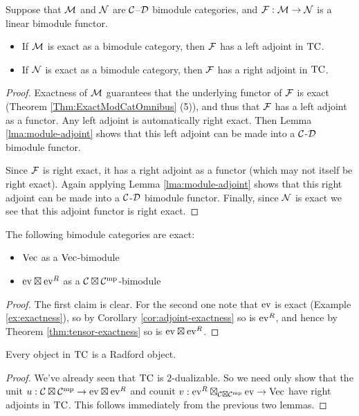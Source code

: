 \documentclass{amsart}
\begin{document}
\begin{lemma}
Suppose that $\cM$ and $\cN$ are $\cC$--$\cD$ bimodule categories, and $\cF: \cM \rightarrow \cN$ is a linear bimodule functor.
\begin{itemize}
\item If $\cM$ is exact as a bimodule category, then $\cF$ has a left adjoint in $\TC$.
\item If $\cN$ is exact as a bimodule category, then $\cF$ has a right adjoint in $\TC$.
\end{itemize}
\end{lemma}

\begin{proof}
Exactness of $\cM$ guarantees that the underlying functor of $\cF$ is exact (Theorem \ref{Thm:ExactModCatOmnibus} (5)), and thus that $\cF$ has a left adjoint as a functor.  Any left adjoint is automatically right exact.  Then Lemma \ref{lma:module-adjoint} shows that this left adjoint can be made into a $\cC$-$\cD$ bimodule functor.   

Since $\cF$ is right exact, it has a right adjoint as a functor (which may not itself be right exact).  Again applying Lemma \ref{lma:module-adjoint} shows that this right adjoint can be made into a $\cC$-$\cD$ bimodule functor.   Finally, since $\cN$ is exact we see that this adjoint functor is right exact.
\end{proof}

\begin{lemma}
The following bimodule categories are exact:
\begin{itemize}
\item $\Vec$ as a $\Vec$-bimodule
\item $\ev \boxtimes \ev^R$ as a $\cC \boxtimes \cC^\mp$-bimodule
\end{itemize}
\end{lemma}
\begin{proof}
The first claim is clear.  For the second one note that $\ev$ is exact (Example \ref{ex:exactness}), so by Corollary \ref{cor:adjoint-exactness} so is $\ev^R$, and hence by Theorem \ref{thm:tensor-exactness} so is $\ev \boxtimes \ev^R$.
\end{proof}

\begin{theorem} \label{thm:TCisRadford}
Every object in $\TC$ is a Radford object.
\end{theorem}
\begin{proof}
We've already seen that $\TC$ is $2$-dualizable.  So we need only show that the unit $u: \cC \boxtimes \cC^\mp \rightarrow \ev \boxtimes \ev^R$ and counit $v: \ev^R \boxtimes_{\cC \boxtimes \cC^\mp} \ev \rightarrow \Vec$ have right adjoints in $\TC$.  This follows immediately from the previous two lemmas.
\end{proof}
\end{document}
